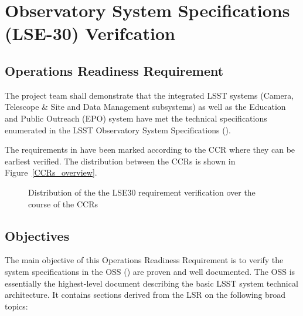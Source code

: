 \section{Observatory System Specifications (LSE-30) Verifcation}  \label{sec:oss}

\subsection{Operations Readiness Requirement}
The project team shall demonstrate that the integrated LSST systems (Camera, Telescope \& Site and Data Management subsystems) as well as the Education and Public Outreach (EPO) system have met the technical specifications enumerated in the LSST Observatory System Specifications ().

The requirements in  have been marked according to the CCR where they can be earliest verified. 
The distribution between the CCRs is shown in Figure~\ref{CCRs_overview}.

\begin{figure}[htbp]
\begin{center}
\caption{Distribution of the the LSE30 requirement verification over the course of the CCRs}
\label{LSE30_CCRdistribution}
\end{center}
\end{figure}


\subsection{Objectives}
The main objective of this Operations Readiness Requirement is to verify the system specifications in the OSS () are proven and well documented. The OSS is essentially the highest-level document describing the basic LSST system technical architecture. It contains sections derived from the LSR on the following broad topics:

